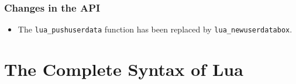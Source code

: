 \documentclass[11pt]{article}
\begin{document}
\subsubsection*{Changes in the API}
\begin{itemize}

\item
The \verb|lua_pushuserdata| function has been replaced by
\verb|lua_newuserdatabox|.

\end{itemize}

\section*{The Complete Syntax of Lua} \label{BNF}


\renewenvironment{Produc}{\vspace{0.8ex}\par\noindent\hspace{3ex}\it\begin{tabular}{rrl}}{\end{tabular}\vspace{0.8ex}\par\noindent}

\renewcommand{\OrNL}{\\ & \Or & }
\newcommand{\Nter}[1]{#1}

\end{document}
